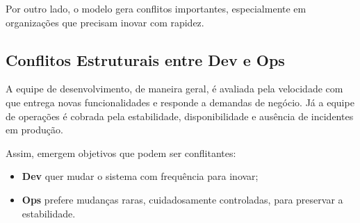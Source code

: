 \documentclass[12pt,a4paper]{report}
\begin{document}
Por outro lado, o modelo gera conflitos importantes, especialmente em
organizações que precisam inovar com rapidez.

\subsection{Conflitos Estruturais entre Dev e Ops}

A equipe de desenvolvimento, de maneira geral, é avaliada pela velocidade com
que entrega novas funcionalidades e responde a demandas de negócio. Já a
equipe de operações é cobrada pela estabilidade, disponibilidade e ausência
de incidentes em produção.

Assim, emergem objetivos que podem ser conflitantes:
\begin{itemize}[nosep]
    \item \textbf{Dev} quer mudar o sistema com frequência para inovar;
    \item \textbf{Ops} prefere mudanças raras, cuidadosamente controladas, para preservar a estabilidade.
\end{itemize}
\end{document}
